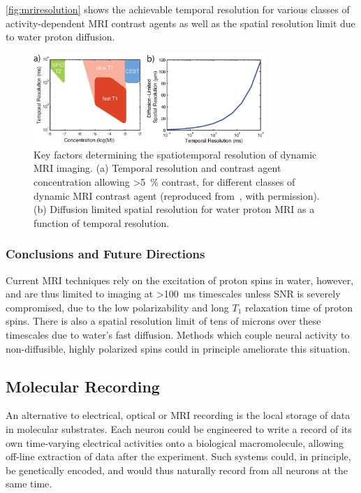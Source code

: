 \autoref{fig:mriresolution} shows the achievable temporal resolution for various classes of activity-dependent MRI contrast agents as well as the spatial resolution limit due to water proton diffusion.

\begin{figure}[htbp]
\caption{Key factors determining the spatiotemporal resolution of dynamic MRI imaging. (a) Temporal resolution and contrast agent concentration allowing \SI{>5}{\percent} contrast, for different classes of dynamic MRI contrast agent (reproduced from~\cite{shapiro06}, with permission). (b) Diffusion limited spatial resolution for water proton MRI as a function of temporal resolution.}
\label{fig:mriresolution}
\centering
\includegraphics[width=0.78\textwidth]{figs/Fig6.eps}
\end{figure}

\subsubsection{Conclusions and Future Directions}

Current MRI techniques rely on the excitation of proton spins in water, however, and are thus limited to imaging at \SI{>100}{\ms} timescales unless SNR is severely compromised, due to the low polarizability and long $T_1$ relaxation time of proton spins.
There is also a spatial resolution limit of tens of microns over these timescales due to water's fast diffusion. Methods which couple neural activity to non-diffusible, highly polarized spins could in principle ameliorate this situation.

\subsection{Molecular Recording}

An alternative to electrical, optical or MRI recording is the local storage of data in molecular substrates.
Each neuron could be engineered to write a record of its own time-varying electrical activities onto a biological macromolecule, allowing off-line extraction of data after the experiment.
Such systems could, in principle, be genetically encoded, and would thus naturally record from all neurons at the same time.


